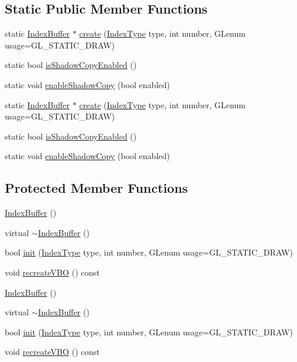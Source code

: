 \subsection*{Static Public Member Functions}
\begin{DoxyCompactItemize}
\item 
static \hyperlink{classIndexBuffer}{Index\+Buffer} $\ast$ \hyperlink{classIndexBuffer_a486a82a9d3b8f6ae57986e29130f9df4}{create} (\hyperlink{classIndexBuffer_ae2117eacd3734db21ce838397fe96c63}{Index\+Type} type, int number, G\+Lenum usage=G\+L\+\_\+\+S\+T\+A\+T\+I\+C\+\_\+\+D\+R\+AW)
\item 
static bool \hyperlink{classIndexBuffer_ae5197ef6f7a5fc960c93c347412a8e3a}{is\+Shadow\+Copy\+Enabled} ()
\item 
static void \hyperlink{classIndexBuffer_a5436c1bb80cb99774050bd6b2ce6eb1c}{enable\+Shadow\+Copy} (bool enabled)
\item 
static \hyperlink{classIndexBuffer}{Index\+Buffer} $\ast$ \hyperlink{classIndexBuffer_ae7dd3ef101c55d2dadb5def75d7fa736}{create} (\hyperlink{classIndexBuffer_ae2117eacd3734db21ce838397fe96c63}{Index\+Type} type, int number, G\+Lenum usage=G\+L\+\_\+\+S\+T\+A\+T\+I\+C\+\_\+\+D\+R\+AW)
\item 
static bool \hyperlink{classIndexBuffer_ae5197ef6f7a5fc960c93c347412a8e3a}{is\+Shadow\+Copy\+Enabled} ()
\item 
static void \hyperlink{classIndexBuffer_a5436c1bb80cb99774050bd6b2ce6eb1c}{enable\+Shadow\+Copy} (bool enabled)
\end{DoxyCompactItemize}
\subsection*{Protected Member Functions}
\begin{DoxyCompactItemize}
\item 
\hyperlink{classIndexBuffer_a9484706e14f9ab9dbcbb35c8f1b58d99}{Index\+Buffer} ()
\item 
virtual \hyperlink{classIndexBuffer_a348889936f378b7942c1e01d83e42866}{$\sim$\+Index\+Buffer} ()
\item 
bool \hyperlink{classIndexBuffer_abced7ea50fe8663e2737ba46310b0df3}{init} (\hyperlink{classIndexBuffer_ae2117eacd3734db21ce838397fe96c63}{Index\+Type} type, int number, G\+Lenum usage=G\+L\+\_\+\+S\+T\+A\+T\+I\+C\+\_\+\+D\+R\+AW)
\item 
void \hyperlink{classIndexBuffer_a2a95f7b337532842aa59468417006a6d}{recreate\+V\+BO} () const
\item 
\hyperlink{classIndexBuffer_a9484706e14f9ab9dbcbb35c8f1b58d99}{Index\+Buffer} ()
\item 
virtual \hyperlink{classIndexBuffer_a14020e196da726c719048a66b45b11a9}{$\sim$\+Index\+Buffer} ()
\item 
bool \hyperlink{classIndexBuffer_abced7ea50fe8663e2737ba46310b0df3}{init} (\hyperlink{classIndexBuffer_ae2117eacd3734db21ce838397fe96c63}{Index\+Type} type, int number, G\+Lenum usage=G\+L\+\_\+\+S\+T\+A\+T\+I\+C\+\_\+\+D\+R\+AW)
\item 
void \hyperlink{classIndexBuffer_a2a95f7b337532842aa59468417006a6d}{recreate\+V\+BO} () const
\end{DoxyCompactItemize}
